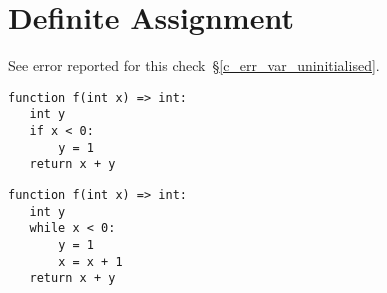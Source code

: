 \chapter{Definite Assignment}
\label{c_definite_assignment}

See error reported for this check~\S\ref{c_err_var_uninitialised}.

\begin{lstlisting}
function f(int x) => int:
   int y
   if x < 0:
       y = 1
   return x + y
\end{lstlisting}

\begin{lstlisting}
function f(int x) => int:
   int y
   while x < 0:
       y = 1
       x = x + 1
   return x + y
\end{lstlisting}
